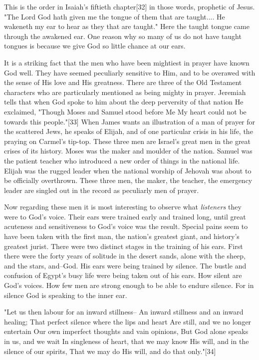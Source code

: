 This is the order in Isaiah's fiftieth chapter[32] in those words,
prophetic of Jesus. "The Lord God hath given me the tongue of them that
are taught.... He wakeneth my ear to hear as they that are taught." Here
the taught tongue came through the awakened ear. One reason why so many of
us do not have taught tongues is because we give God so little chance at
our ears.

It is a striking fact that the men who have been mightiest in prayer have
known God well. They have seemed peculiarly sensitive to Him, and to be
overawed with the sense of His love and His greatness. There are three of
the Old Testament characters who are particularly mentioned as being
mighty in prayer. Jeremiah tells that when God spoke to him about the deep
perversity of that nation He exclaimed, "Though Moses and Samuel stood
before Me My heart could not be towards this people."[33] When James wants
an illustration of a man of prayer for the scattered Jews, he speaks of
Elijah, and of one particular crisis in his life, the praying on Carmel's
tip-top. These three men are Israel's great men in the great crises of its
history. Moses was the maker and moulder of the nation. Samuel was the
patient teacher who introduced a new order of things in the national life.
Elijah was the rugged leader when the national worship of Jehovah was
about to be officially overthrown. These three men, the maker, the
teacher, the emergency leader are singled out in the record as peculiarly
men of prayer.

Now regarding these men it is most interesting to observe what \textit{listeners}
they were to God's voice. Their ears were trained early and trained long,
until great acuteness and sensitiveness to God's voice was the result.
Special pains seem to have been taken with the first man, the nation's
greatest giant, and history's greatest jurist. There were two distinct
stages in the training of his ears. First there were the forty years of
solitude in the desert sands, alone with the sheep, and the stars,
and--God. His ears were being trained by silence. The bustle and confusion
of Egypt's busy life were being taken out of his ears. How silent are
God's voices. How few men are strong enough to be able to endure silence.
For in silence God is speaking to the inner ear.

    "Let us then labour for an inward stillness--
    An inward stillness and an inward healing;
    That perfect silence where the lips and heart
    Are still, and we no longer entertain
    Our own imperfect thoughts and vain opinions,
    But God alone speaks in us, and we wait
    In singleness of heart, that we may know
    His will, and in the silence of our spirits,
    That we may do His will, and do that only."[34]

